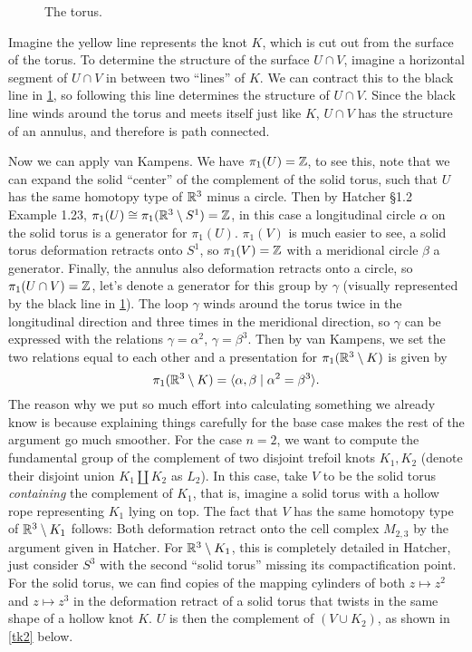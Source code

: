 \begin{solution}
    \begin{figure}[H]
    \centering
    \caption{The torus.}
    \label{torus}
    \end{figure}
    Imagine the yellow line represents the knot $K$, which is cut out from the surface of the torus. To determine the structure of the surface $U \cap V$, imagine a horizontal segment of $U \cap V$ in between two ``lines'' of $K$. We can contract this to the black line in \cref{torus}, so following this line determines the structure of $U \cap V$. Since the black line winds around the torus and meets itself just like $K$, $U \cap V$ has the structure of an annulus, and therefore is path connected. 

    Now we can apply van Kampens. We have $\pi_1(U)=\mathbb{Z}$, to see this, note that we can expand the solid ``center'' of the complement of the solid torus, such that $U$ has the same homotopy type of $\mathbb{R}^3$ minus a circle. Then by Hatcher \S 1.2 Example 1.23, $\pi_1(U) \cong \pi_1(\mathbb{R}^3\setminus S^1)=\mathbb{Z} $, in this case a longitudinal circle $\alpha $ on the solid torus is a generator for $\pi_1(U)$. $\pi_1(V)$ is much easier to see, a solid torus deformation retracts onto $S^1 $, so $\pi_1(V)=\mathbb{Z}$ with a meridional circle $\beta $ a generator. Finally, the annulus also deformation retracts onto a circle, so $\pi_1(U \cap V)=\mathbb{Z}$, let's denote a generator for this group by $\gamma $ (visually represented by the black line in \cref{torus}). The loop $\gamma $ winds around the torus twice in the longitudinal direction and three times in the meridional direction, so $\gamma $ can be expressed with the relations $\gamma =\alpha ^2,\, \gamma =\beta ^3$. Then by van Kampens, we set the two relations equal to each other and a presentation for $\pi_1(\mathbb{R}^3 \setminus K)$ is given by \[
        \pi_1(\mathbb{R}^3\setminus K)=\langle \alpha ,\beta  \mid  \alpha ^2=\beta ^3\rangle .
    \] The reason why we put so much effort into calculating something we already know is because explaining things carefully for the base case makes the rest of the argument go much smoother. For the case $n=2$, we want to compute the fundamental group of the complement of two disjoint trefoil knots $K_1,K_2$ (denote their disjoint union $K_1\amalg K_2$ as $L_2$). In this case, take $V$ to be the solid torus \emph{containing} the complement of $K_1$, that is, imagine a solid torus with a hollow rope representing $K_1$ lying on top. The fact that $V$ has the same homotopy type of $\mathbb{R}^3 \setminus K_1$ follows: Both deformation retract onto the cell complex $M_{2,3}$ by the argument given in Hatcher. For $\mathbb{R}^3\setminus K_1$, this is completely detailed in Hatcher, just consider $S^3$ with the second ``solid torus'' missing its compactification point. For the solid torus, we can find copies of the mapping cylinders of both $z \mapsto z^2$ and $z \mapsto z^3$ in the deformation retract of a solid torus that twists in the same shape of a hollow knot $K$. $U$ is then the complement of $(V \cup K_2)$, as shown in \cref{tk2} below.

\end{solution}
